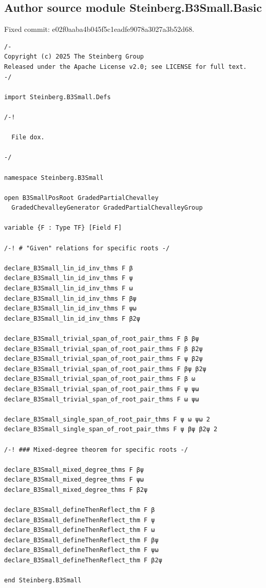 \subsection*{Author source module Steinberg.B3Small.Basic}
\noindent Fixed commit: e02f0aaba4b045f5c1eadfe9078a3027a3b52d68.
\begin{Verbatim}
/-
Copyright (c) 2025 The Steinberg Group
Released under the Apache License v2.0; see LICENSE for full text.
-/

import Steinberg.B3Small.Defs

/-!

  File dox.

-/

namespace Steinberg.B3Small

open B3SmallPosRoot GradedPartialChevalley
  GradedChevalleyGenerator GradedPartialChevalleyGroup

variable {F : Type TF} [Field F]

/-! # "Given" relations for specific roots -/

declare_B3Small_lin_id_inv_thms F β
declare_B3Small_lin_id_inv_thms F ψ
declare_B3Small_lin_id_inv_thms F ω
declare_B3Small_lin_id_inv_thms F βψ
declare_B3Small_lin_id_inv_thms F ψω
declare_B3Small_lin_id_inv_thms F β2ψ

declare_B3Small_trivial_span_of_root_pair_thms F β βψ
declare_B3Small_trivial_span_of_root_pair_thms F β β2ψ
declare_B3Small_trivial_span_of_root_pair_thms F ψ β2ψ
declare_B3Small_trivial_span_of_root_pair_thms F βψ β2ψ
declare_B3Small_trivial_span_of_root_pair_thms F β ω
declare_B3Small_trivial_span_of_root_pair_thms F ψ ψω
declare_B3Small_trivial_span_of_root_pair_thms F ω ψω

declare_B3Small_single_span_of_root_pair_thms F ψ ω ψω 2
declare_B3Small_single_span_of_root_pair_thms F ψ βψ β2ψ 2

/-! ### Mixed-degree theorem for specific roots -/

declare_B3Small_mixed_degree_thms F βψ
declare_B3Small_mixed_degree_thms F ψω
declare_B3Small_mixed_degree_thms F β2ψ

declare_B3Small_defineThenReflect_thm F β
declare_B3Small_defineThenReflect_thm F ψ
declare_B3Small_defineThenReflect_thm F ω
declare_B3Small_defineThenReflect_thm F βψ
declare_B3Small_defineThenReflect_thm F ψω
declare_B3Small_defineThenReflect_thm F β2ψ

end Steinberg.B3Small
\end{Verbatim}
